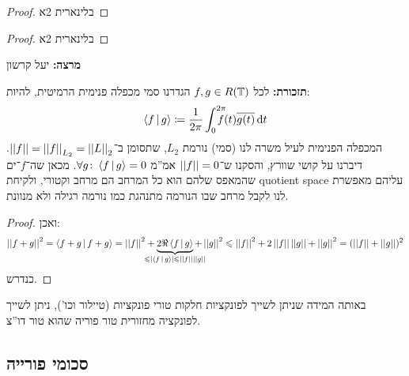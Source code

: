 \documentclass[name=רשימות חדו''א 2א]{../../../tex/classes/noChapterMegasumPreamble}
\begin{document}
	\begin{proof}
		בלינארית 2א
	\end{proof}
	\begin{proof}
		בלינארית 2א
	\end{proof}

	\textbf{מרצה: }יעל קרשון

	\textbf{תזכורת: }לכל $f, g \in R(\mathbb{T})$ הגדרנו סמי מכפלה פנימית הרמיטית, להיות:
	\[ \left \langle f \,\middle|\, g \right \rangle \coloneqq \frac{1}{2\pi}\int^{2\pi}_0\!\!\!\!\!\! f(t)\overline{g(t)}\,\mathrm{d}t \]
	המכפלה הפנימית לעיל משרה לנו (סמי) נורמת $L_2$, שתסומן ב־$\left \vert \left \vert f \right \vert \right \vert = \left \vert \left \vert f \right \vert \right \vert_{L_2} = \left \vert \left \vert L \right \vert \right \vert_2$. דיברנו על קושי שוורץ, והסקנו ש־$\left \vert \left \vert f \right \vert \right \vert = 0$ אמ''מ $\forall g \colon \left \langle f \,\middle|\, g \right \rangle = 0$. מכאן שה־$f$־ים שהמאפס שלהם הוא כל המרחב הם מרחב וקטורי, ולקיחת quotient space עליהם מאפשרת לנו לקבל מרחב שבו הנורמה מתנהגת כמו נורמה רגילה ולא מנוונת.

	\begin{proof}
		ואכן:
		\[ \norm{f + g}^{2} = \mut{f + g}{ f + g} = \norm {f}^{2} + \underbrace{2\Re\mut{f}{g}}_{\mathclap{\le \sof{\mut{f}{g}} \le \norm f \norm g}} + \norm {g}^{2} \le \norm{f}^{2} + 2 \norm f \norm g + \norm{g}^{2} = (\norm f + \norm g)^{2} \]
		כנדרש.
	\end{proof}

	באותה המידה שניתן לשייך לפונקציות חלקות טורי פונקציות (טיילור וכו'), ניתן לשייך לפונקציה מחזורית טור פוריה שהוא טור דו''צ.
\subsection{סכומי פורייה}
\end{document}
